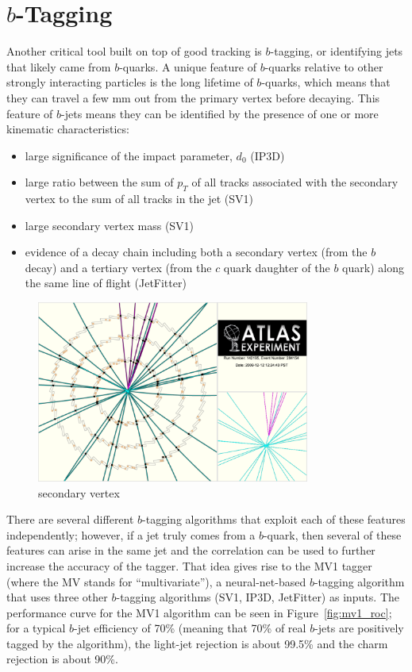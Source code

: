 \section{$b$-Tagging}
\label{sec:b-tag}
Another critical tool built on top of good tracking is $b$-tagging, or identifying jets that likely came from $b$-quarks.  A unique feature of $b$-quarks relative to other strongly interacting particles is the long lifetime of $b$-quarks, which means that they can travel a few mm out from the primary vertex before decaying.  This feature of $b$-jets means they can be identified by the presence of one or more kinematic characteristics:

\begin{itemize}
	\item large significance of the impact parameter, $d_0$ (IP3D)
	\item large ratio between the sum of $p_T$ of all tracks associated with the secondary vertex to the sum of all tracks in the jet (SV1)
	\item large secondary vertex mass (SV1)
	\item evidence of a decay chain including both a secondary vertex (from the $b$ decay) and a tertiary vertex (from the $c$ quark daughter of the $b$ quark) along the same line of flight (JetFitter)
\end{itemize}

\begin{figure}
	\includegraphics[width=0.8\textwidth]{ReconstructionPerformance/images/secondary_vertex.pdf}
	\caption{secondary vertex	\label{fig:secondary_vertex}  }
\end{figure}

There are several different $b$-tagging algorithms that exploit each of these features independently; however, if a jet truly comes from a $b$-quark, then several of these features can arise in the same jet and the correlation can be used to further increase the accuracy of the tagger.  That idea gives rise to the MV1 tagger (where the MV stands for ``multivariate''), a neural-net-based $b$-tagging algorithm that uses three other $b$-tagging algorithms (SV1, IP3D, JetFitter) as inputs.   The performance curve for the MV1 algorithm can be seen in Figure~\ref{fig:mv1_roc}; for a typical $b$-jet efficiency of 70\% (meaning that 70\% of real $b$-jets are positively tagged by the algorithm), the light-jet rejection is about 99.5\% and the charm rejection is about 90\%.


